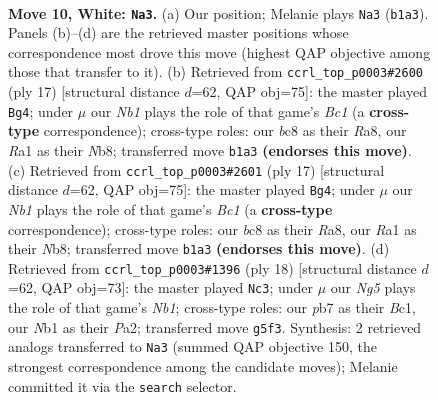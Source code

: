 \documentclass[11pt]{article}
\begin{document}
\clearpage

\begin{figure}[p]\centering
\begin{subfigure}{0.46\textwidth}\centering
\resizebox{\linewidth}{!}{%
\newchessgame
\chessboard[
  setfen={rnbqkb1r/ppp1pp2/1n4p1/3pP1Np/P2P4/1B6/1PP2PPP/RNBQ1RK1 w kq - 0 10},
  showmover=false,
  pgfstyle=straightmove, color=movearrow, markmove={b1-a3}
]}
\caption{}
\end{subfigure}\hfill
\begin{subfigure}{0.46\textwidth}\centering
\resizebox{\linewidth}{!}{%
\newchessgame
\chessboard[
  setfen={rnbq1rk1/ppp2ppp/3b1n2/3Pp3/2P1P3/P1N2N2/1P4PP/R1BQKB1R b KQ - 2 9},
  showmover=false,
  pgfstyle=straightmove, color=movearrow, markmove={c8-g4}
]}
\caption{}
\end{subfigure}
\\[4pt]
\begin{subfigure}{0.46\textwidth}\centering
\resizebox{\linewidth}{!}{%
\newchessgame
\chessboard[
  setfen={rnbq1rk1/ppp2ppp/3b1n2/3Pp3/2P1P3/P1N2N2/1P4PP/R1BQKB1R b KQ - 2 9},
  showmover=false,
  pgfstyle=straightmove, color=movearrow, markmove={c8-g4}
]}
\caption{}
\end{subfigure}\hfill
\begin{subfigure}{0.46\textwidth}\centering
\resizebox{\linewidth}{!}{%
\newchessgame
\chessboard[
  setfen={r2nkb1r/ppqb1p1p/3p1np1/2p1p1N1/2P1P3/1Q1P4/PP2BPPP/RNB2RK1 w kq - 0 10},
  showmover=false,
  pgfstyle=straightmove, color=movearrow, markmove={b1-c3}
]}
\caption{}
\end{subfigure}
\caption{\textbf{Move 10, White: \texttt{Na3}.} (a) Our position; Melanie plays \texttt{Na3} (\texttt{b1a3}). Panels (b)--(d) are the retrieved master positions whose correspondence most drove this move (highest QAP objective among those that transfer to it). (b) Retrieved from \texttt{ccrl\_top\_p0003\#2600} (ply 17) [structural distance $d$=62, QAP obj=75]: the master played \texttt{Bg4}; under $\mu$ our \emph{Nb1} plays the role of that game's \emph{Bc1} (a \textbf{cross-type} correspondence); cross-type roles: our \emph{b}c8 as their \emph{R}a8, our \emph{R}a1 as their \emph{N}b8; transferred move \texttt{b1a3} \textbf{(endorses this move)}. (c) Retrieved from \texttt{ccrl\_top\_p0003\#2601} (ply 17) [structural distance $d$=62, QAP obj=75]: the master played \texttt{Bg4}; under $\mu$ our \emph{Nb1} plays the role of that game's \emph{Bc1} (a \textbf{cross-type} correspondence); cross-type roles: our \emph{b}c8 as their \emph{R}a8, our \emph{R}a1 as their \emph{N}b8; transferred move \texttt{b1a3} \textbf{(endorses this move)}. (d) Retrieved from \texttt{ccrl\_top\_p0003\#1396} (ply 18) [structural distance $d$=62, QAP obj=73]: the master played \texttt{Nc3}; under $\mu$ our \emph{Ng5} plays the role of that game's \emph{Nb1}; cross-type roles: our \emph{p}b7 as their \emph{B}c1, our \emph{N}b1 as their \emph{P}a2; transferred move \texttt{g5f3}. Synthesis: 2 retrieved analogs transferred to \texttt{Na3} (summed QAP objective 150, the strongest correspondence among the candidate moves); Melanie committed it via the \texttt{search} selector.}
\label{fig:thought-m18}
\end{figure}
\end{document}
